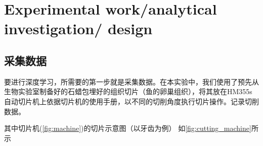 \section{Experimental work/analytical investigation/ design}

\subsection{采集数据}
要进行深度学习，所需要的第一步就是采集数据。在本实验中，我们使用了预先从生物实验室制备好的石蜡包埋好的组织切片（鱼的卵巢组织），将其放在HM355s自动切片机上依据切片机的使用手册，以不同的切削角度执行切片操作。记录切削数据。


其中切片机(\autoref{fig:machine})的切片示意图（以牙齿为例） 如\autoref{fig:cutting_machine}所示

